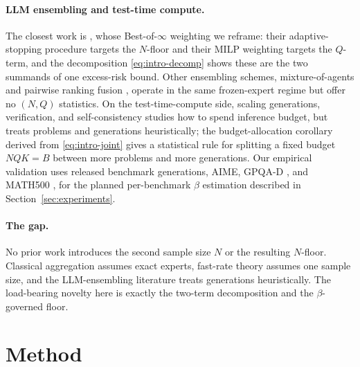 \documentclass{article} %
\begin{document}
\paragraph{LLM ensembling and test-time compute.}
The closest work is \citet{komiyama2026best}, whose Best-of-$\infty$ weighting we
reframe: their adaptive-stopping procedure targets the $N$-floor and their MILP
weighting targets the $Q$-term, and the decomposition \eqref{eq:intro-decomp}
shows these are the two summands of one excess-risk bound. Other ensembling
schemes, mixture-of-agents \citep{wang2024mixtureofagentsel} and pairwise
ranking fusion \citep{jiang2023llmblenderel}, operate in the same frozen-expert
regime but offer no $(N,Q)$ statistics. On the test-time-compute side, scaling
generations, verification, and self-consistency
\citep{brown2024largelm,snell2025scalinglt,wu2024inferencesl,wang2022selfconsistencyic,gao2022scalinglf,cobbe2021trainingvt,chen2024provablesl,aggarwal2023letsss}
studies how to spend inference budget, but treats problems and generations
heuristically; the budget-allocation corollary derived from
\eqref{eq:intro-joint} gives a statistical rule for splitting a fixed budget
$NQK=B$ between more problems and more generations. Our empirical validation uses
released benchmark generations, AIME, GPQA-D \citep{rein2023gpqaag}, and MATH500
\citep{hendrycks2021measuringmp}, for the planned per-benchmark $\beta$
estimation described in Section~\ref{sec:experiments}.

\paragraph{The gap.}
No prior work introduces the second sample size $N$ or the resulting $N$-floor.
Classical aggregation assumes exact experts, fast-rate theory assumes one sample
size, and the LLM-ensembling literature treats generations heuristically. The
load-bearing novelty here is exactly the two-term decomposition and the
$\beta$-governed floor.


\section{Method}
\label{sec:method}
\end{document}
